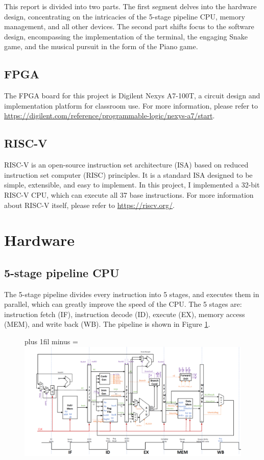 \documentclass[
	a4paper, %
	11pt, %
]{CSUniSchoolLabReport}
\def\Scentering{\leftskip=0pt plus 1fil minus \Rmargin
                \rightskip=\leftskip}
\begin{document}
This report is divided into two parts. The first segment delves into the hardware design, concentrating on the intricacies of the 5-stage pipeline CPU, memory management, and all other devices. The second part shifts focus to the software design, encompassing the implementation of the terminal, the engaging Snake game, and the musical pursuit in the form of the Piano game.

\subsection{FPGA}
The FPGA board for this project is Digilent Nexys A7-100T, a circuit design and implementation platform for classroom use. For more information, please refer to \url{https://digilent.com/reference/programmable-logic/nexys-a7/start}.

\subsection{RISC-V}
RISC-V is an open-source instruction set architecture (ISA) based on reduced instruction set computer (RISC) principles. It is a standard ISA designed to be simple, extensible, and easy to implement. In this project, I implemented a 32-bit RISC-V CPU, which can execute all 37 base instructions. For more information about RISC-V itself, please refer to \url{https://riscv.org/}.
\section{Hardware}

\subsection{5-stage pipeline CPU}
The 5-stage pipeline divides every instruction into 5 stages, and executes them in parallel, which can greatly improve the speed of the CPU. The 5 stages are: instruction fetch (IF), instruction decode (ID), execute (EX), memory access (MEM), and write back (WB). The pipeline is shown in Figure \ref{fig:image2}.

\begin{figure}[htbp]
    \Scentering
    \includegraphics[width=.9\paperwidth]{image2.png}
    \caption{}
    \label{fig:image2}
\end{figure}
\end{document}
